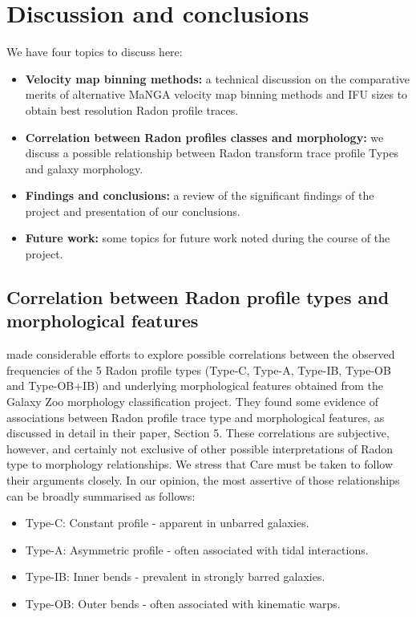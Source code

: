 \section{Discussion and conclusions}
\label{sec:discussion}
We have four topics to discuss here:
\begin{itemize}
\item \textbf{Velocity map binning methods:} a technical discussion on the comparative merits of alternative MaNGA velocity map binning methods and IFU sizes to obtain best resolution Radon profile traces.
\item \textbf{Correlation between Radon profiles classes and morphology:} we discuss a possible relationship between Radon transform trace profile Types and galaxy morphology.
\item \textbf{Findings and conclusions:} a review of the significant findings of the project and presentation of our conclusions.
\item \textbf{Future work:} some topics for future work noted during the course of the project. 
\end{itemize}



\subsection[Correlation between Radon profiles and morphology]{Correlation between Radon profile types and morphological features}
\label{sec:correlations}
\cite{2018MNRAS.480.2217S} made considerable efforts to explore  possible correlations between the observed frequencies of the 5 Radon profile types (Type-C, Type-A, Type-IB, Type-OB and Type-OB+IB) and underlying morphological features obtained from the Galaxy Zoo morphology classification project. They found some evidence of associations between Radon profile trace type and morphological features, as discussed in detail in their paper, Section 5. These correlations are subjective, however, and certainly not exclusive of other possible interpretations of Radon type to morphology relationships. We stress that Care must be taken to follow their arguments closely. In our opinion, the most assertive of those relationships can be broadly summarised as follows:
\begin{itemize}
\item Type-C: Constant profile - apparent in unbarred galaxies.
\item Type-A: Asymmetric profile - often associated with tidal interactions.
\item Type-IB: Inner bends - prevalent in strongly barred galaxies.
\item Type-OB: Outer bends - often associated with kinematic warps.
\end{itemize}

